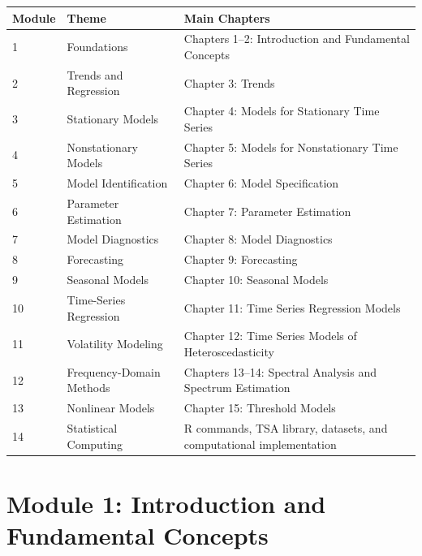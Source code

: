 \documentclass[11pt,a4paper]{article}
\begin{document}
\begin{longtable}{p{}p{}p{}}
\toprule
\textbf{Module} & \textbf{Theme} & \textbf{Main Chapters} \\
\midrule
1 & Foundations &
Chapters 1--2: Introduction and Fundamental Concepts \\

2 & Trends and Regression &
Chapter 3: Trends \\

3 & Stationary Models &
Chapter 4: Models for Stationary Time Series \\

4 & Nonstationary Models &
Chapter 5: Models for Nonstationary Time Series \\

5 & Model Identification &
Chapter 6: Model Specification \\

6 & Parameter Estimation &
Chapter 7: Parameter Estimation \\

7 & Model Diagnostics &
Chapter 8: Model Diagnostics \\

8 & Forecasting &
Chapter 9: Forecasting \\

9 & Seasonal Models &
Chapter 10: Seasonal Models \\

10 & Time-Series Regression &
Chapter 11: Time Series Regression Models \\

11 & Volatility Modeling &
Chapter 12: Time Series Models of Heteroscedasticity \\

12 & Frequency-Domain Methods &
Chapters 13--14: Spectral Analysis and Spectrum Estimation \\

13 & Nonlinear Models &
Chapter 15: Threshold Models \\

14 & Statistical Computing &
R commands, TSA library, datasets, and computational implementation \\
\bottomrule
\end{longtable}

\section{Module 1: Introduction and Fundamental Concepts}
\end{document}
